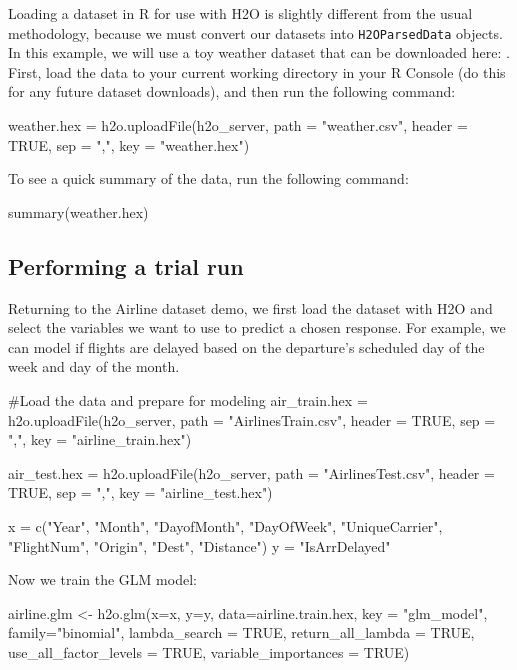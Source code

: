 \documentclass[11pt]{article}
\begin{document}
Loading a dataset in R for use with H2O is slightly different from the usual methodology, because we must convert our datasets into \texttt{H2OParsedData} objects. In this example, we will use a toy weather dataset that can be downloaded here: . First, load the data to your current working directory in your R Console (do this for any future dataset downloads), and then run the following command:
\begin{spverbatim}
weather.hex = h2o.uploadFile(h2o_server, path = "weather.csv", header = TRUE, sep = ",", key = "weather.hex")
\end{spverbatim}
\bigskip
\noindent
To see a quick summary of the data, run the following command:
\begin{spverbatim}
summary(weather.hex)
\end{spverbatim}


\subsection{Performing a trial run} \label{3.2}
Returning to the Airline dataset demo, we first load the dataset with H2O and select the variables we want to use to predict a chosen response. For example, we can model if flights are delayed based on the departure's scheduled day of the week and day of the month.
\begin{spverbatim}

#Load the data and prepare for modeling
air_train.hex = h2o.uploadFile(h2o_server, path = "AirlinesTrain.csv", header = TRUE, sep = ",", key = "airline_train.hex")

air_test.hex = h2o.uploadFile(h2o_server, path = "AirlinesTest.csv", header = TRUE, sep = ",", key = "airline_test.hex")

x = c("Year", "Month", "DayofMonth", "DayOfWeek", "UniqueCarrier", "FlightNum", "Origin", "Dest", "Distance")
y = "IsArrDelayed" 

\end{spverbatim}

Now we train the GLM model:

\begin{spverbatim}
airline.glm <- h2o.glm(x=x, 
                     y=y, 
                     data=airline.train.hex,
                     key = "glm_model",
                     family="binomial",
                     lambda_search = TRUE,
                     return_all_lambda = TRUE,
                     use_all_factor_levels = TRUE,
                     variable_importances = TRUE)
\end{spverbatim}
\end{document}
